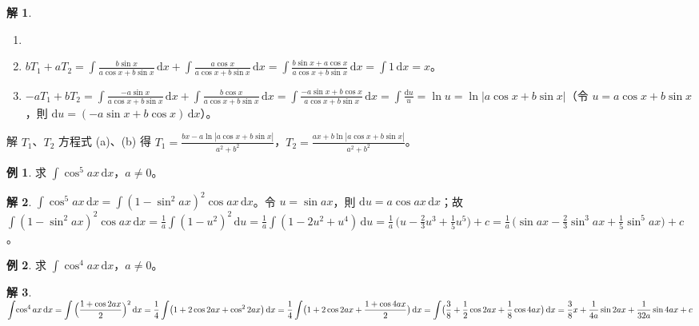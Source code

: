 \documentclass[12pt]{extarticle}
\newcommand{\ds}{\displaystyle}
\theoremstyle{definition}
\newtheorem*{ex}{例}
\newtheorem*{sol}{解}
\begin{document}
\begin{sol}
  \begin{enumerate}[label=(\alph*)]\setlength{\itemsep}{0pt}
    \item[]
    \item $\ds b T_1 + a T_2 = \int\!\frac{b\sin x}{a\cos x + b\sin x}\,\text{d}x + \int\!\frac{a\cos x}{a\cos x + b\sin x}\,\text{d}x = \int\!\frac{b\sin x + a\cos x}{a\cos x + b\sin x}\,\text{d}x = \int 1\,\text{d}x = x$。
    \item $\ds -a T_1 + b T_2 = \int\!\frac{-a\sin x}{a\cos x + b\sin x}\,\text{d}x + \int\!\frac{b\cos x}{a\cos x + b\sin x}\,\text{d}x = \int\!\frac{-a\sin x + b\cos x}{a\cos x + b\sin x}\,\text{d}x = \int\!\frac{\text{d}u}{u} = \ln u = \ln|a\cos x + b\sin x|$（令 $\ds u = a\cos x + b\sin x$，則 $\ds\text{d}u = (-a\sin x + b\cos x)\,\text{d}x$）。
  \end{enumerate}
  解 $T_1$、$T_2$ 方程式 (a)、(b) 得 $\ds T_1 = \frac{bx - a\ln|a\cos x + b\sin x|}{a^2 + b^2}$，$\ds T_2 = \frac{ax + b\ln|a\cos x + b\sin x|}{a^2 + b^2}$。
\end{sol}

\begin{ex}
  求 $\ds\int\!\cos^5 ax\,\mathrm{d}x$，$a\ne 0$。 
\end{ex}

\begin{sol}
  $\ds\int\!\cos^5 ax\,\mathrm{d}x = \int(1-\sin^2 ax)^2\cos ax\,\mathrm{d}x$。令 $\ds u = \sin ax$，則 $\ds\mathrm{d}u = a\cos ax\,\mathrm{d}x$；故 $\ds\int(1-\sin^2 ax)^2\cos ax\,\mathrm{d}x = \frac{1}{a}\int(1-u^2)^2\,\mathrm{d}u = \frac{1}{a}\int(1 - 2u^2 + u^4)\,\mathrm{d}u = \frac{1}{a}\,\Big(u - \frac{2}{3}u^3 + \frac{1}{5}u^5\Big) + c = \frac{1}{a}\,\Big(\sin ax - \frac{2}{3}\sin^3 ax + \frac{1}{5}\sin^5 ax\Big) + c$。
\end{sol}

\begin{ex}
  求 $\ds\int\!\cos^4 ax\,\mathrm{d}x$，$a\ne 0$。
\end{ex}
   
\begin{sol}
  $\ds\int\!\cos^4 ax\,\mathrm{d}x = \int\Big(\frac{1+\cos 2ax}{2}\Big)^2\,\mathrm{d}x = \frac{1}{4}\int\!\big(1+2\cos 2ax+\cos^2 2ax\big)\,\mathrm{d}x = \frac{1}{4}\int\!\big(1+2\cos 2ax+\frac{1 + \cos 4ax}{2}\big)\,\mathrm{d}x \\= \int\!\big(\frac{3}{8}+\frac{1}{2}\cos 2ax+\frac{1}{8}\cos 4ax\big)\,\mathrm{d}x = \frac{3}{8}x +\frac{1}{4a}\sin 2ax+\frac{1}{32a}\sin 4ax + c$
\end{sol}
 
\end{document}
